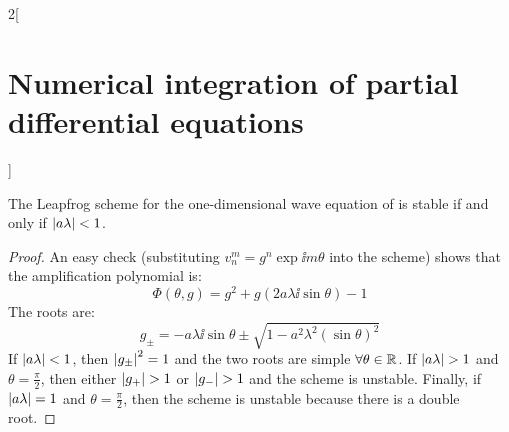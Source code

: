 \documentclass[../../../main_math.tex]{subfiles}
\begin{document}
\begin{multicols}{2}[\section{Numerical integration of partial differential equations}]
\begin{proposition}
    The Leapfrog scheme for the one-dimensional wave equation of  is stable if and only if $\abs{a\lambda}< 1$.
  \end{proposition}
  \begin{proof}
    An easy check (substituting $v_n^m=g^n \exp{\ii m\theta}$ into the scheme) shows that the amplification polynomial is:
    $$
      \Phi(\theta,g)=g^2+g(2a\lambda\ii\sin\theta)-1
    $$
    The roots are:
    $$
      g_{\pm} = -a\lambda\ii\sin\theta\pm\sqrt{1-a^2\lambda^2{(\sin\theta)}^2}
    $$
    If $\abs{a\lambda}<1$, then $\abs{g_{\pm}}^2=1$ and the two roots are simple $\forall \theta\in\mathbb{R}$. If $\abs{a\lambda}>1$ and $\theta=\frac{\pi}{2}$, then either $\abs{g_+}>1$ or $\abs{g_-}>1$ and the scheme is unstable. Finally, if $\abs{a\lambda}=1$ and $\theta=\frac{\pi}{2}$, then the scheme is unstable because there is a double root.
  \end{proof}

\end{multicols}
\end{document}
